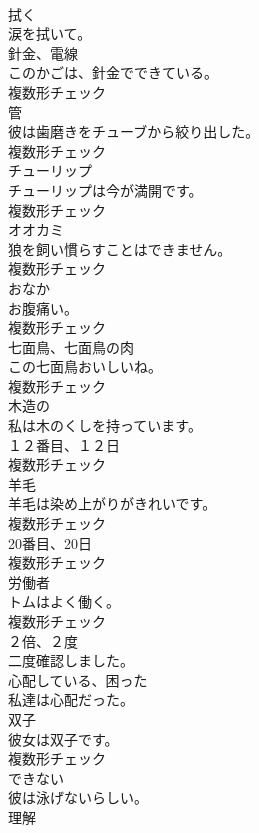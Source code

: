 \documentclass[8pt]{extreport}
\begin{document}
\begin{CJK}{UTF8}{min}
\\	[動詞]	拭く	
\\	涙を拭いて。	
\\	[名詞]	針金、電線	
\\	このかごは、針金でできている。	
\\	複数形チェック
\\	[名詞]	管	
\\	彼は歯磨きをチューブから絞り出した。	
\\	複数形チェック
\\	[名詞]	チューリップ	
\\	チューリップは今が満開です。	
\\	複数形チェック
\\	[名詞]	オオカミ	
\\	狼を飼い慣らすことはできません。	
\\	複数形チェック
\\	[名詞]	おなか	
\\	お腹痛い。	
\\	複数形チェック
\\	[名詞]	七面鳥、七面鳥の肉	
\\	この七面鳥おいしいね。	
\\	複数形チェック
\\	[形容詞]	木造の	
\\	私は木のくしを持っています。	
\\	[名詞]	１２番目、１２日	
\\	複数形チェック
\\	[名詞]	羊毛	
\\	羊毛は染め上がりがきれいです。	
\\	複数形チェック
\\	[名詞]	20番目、20日	
\\	複数形チェック
\\	[名詞]	労働者	
\\	トムはよく働く。	
\\	複数形チェック
\\	[副詞]	２倍、２度	
\\	二度確認しました。	
\\	[形容詞]	心配している、困った	
\\	私達は心配だった。	
\\	[名詞]	双子	
\\	彼女は双子です。	
\\	複数形チェック
\\	[形容詞]	できない	
\\	彼は泳げないらしい。	
\\	[名詞]	理解	

\end{CJK}
\end{document}
